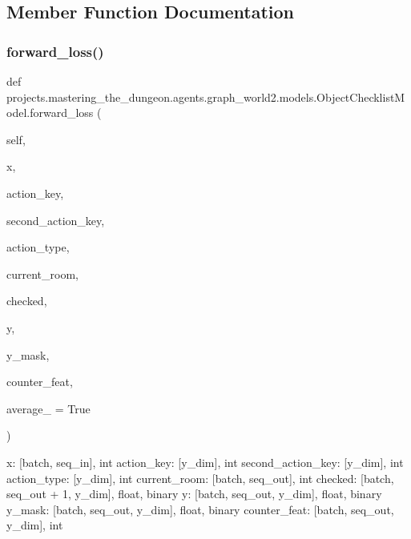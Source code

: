 \subsection{Member Function Documentation}
\mbox{\label{classprojects_1_1mastering__the__dungeon_1_1agents_1_1graph__world2_1_1models_1_1ObjectChecklistModel_a1308b00f5b1e8f1f621abf1c91cbc751}} 
\subsubsection{\texorpdfstring{forward\+\_\+loss()}{forward\_loss()}}
{\footnotesize\ttfamily def projects.\+mastering\+\_\+the\+\_\+dungeon.\+agents.\+graph\+\_\+world2.\+models.\+Object\+Checklist\+Model.\+forward\+\_\+loss (\begin{DoxyParamCaption}\item[{}]{self,  }\item[{}]{x,  }\item[{}]{action\+\_\+key,  }\item[{}]{second\+\_\+action\+\_\+key,  }\item[{}]{action\+\_\+type,  }\item[{}]{current\+\_\+room,  }\item[{}]{checked,  }\item[{}]{y,  }\item[{}]{y\+\_\+mask,  }\item[{}]{counter\+\_\+feat,  }\item[{}]{average\+\_\+ = {\ttfamily True} }\end{DoxyParamCaption})}

\begin{DoxyVerb}x: [batch, seq_in], int
action_key: [y_dim], int
second_action_key: [y_dim], int
action_type: [y_dim], int
current_room: [batch, seq_out], int
checked: [batch, seq_out + 1, y_dim], float, binary
y: [batch, seq_out, y_dim], float, binary
y_mask: [batch, seq_out, y_dim], float, binary
counter_feat: [batch, seq_out, y_dim], int
\end{DoxyVerb}
 

